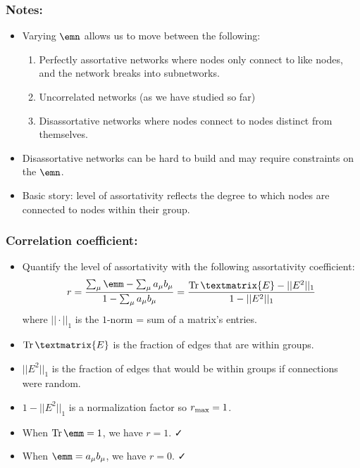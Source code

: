 \begin{frame}
  \frametitle{Notes:}

  \begin{itemize}
  \item<1-> Varying $\emn$ allows us to move
    between the following:
    \begin{enumerate}
    \item<2-> 
      \alert{Perfectly assortative networks} where
      nodes only connect to like nodes, and the
      network breaks into subnetworks.\\
    \item<4->
      \alert{Uncorrelated networks} (as we have studied so far)\\
    \item<6->
      \alert{Disassortative networks} where nodes connect
      to nodes distinct from themselves.
    \end{enumerate}
  \item<7->
    Disassortative networks can be hard to build
    and may require constraints on the $\emn$.
  \item<8->
    Basic story: level of assortativity reflects
    the degree to which nodes are connected to
    nodes within their group.
  \end{itemize}

\end{frame}

\begin{frame}
  \frametitle{Correlation coefficient:}

  \begin{itemize}
  \item Quantify the level of assortativity
    with the following \alert{assortativity coefficient}\cite{newman2003e}:
    $$
    r = 
    \frac{
      \sum_{\mu} \emm - \sum_{\mu} a_{\mu} b_{\mu}
      }
    {
      1 - \sum_{\mu} a_{\mu} b_{\mu}
    }
    =
    \frac{
      {\textnormal{Tr}} \, \textmatrix{E} - || E^2 ||_1
    }
    {
      1 - || E^2 ||_1
    }
    $$
    where $|| \cdot ||_1$ is the $1$-norm = sum of a matrix's entries.
  \item<2->
    ${\textnormal{Tr}} \, \textmatrix{E}$ is the fraction of edges that are within groups.
  \item<3->
    $|| E^2 ||_1$ is the fraction of edges that would be within
    groups if connections were random.
  \item<4->
    $1 - || E^2 ||_1$ is a normalization factor so $r_{\textnormal{max}} = 1$.
  \item<5->
    When $\textnormal{Tr}\, \emm = 1$, we have $r=1$. \alert{\faCheck}
  \item<6->
    When $\emm = a_{\mu} b_{\mu}$, we have $r=0$. \alert{\faCheck}
  \end{itemize}

\end{frame}

